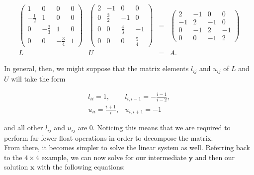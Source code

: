 \documentclass[12pt]{article}
\numberwithin{equation}{section}
\begin{document}
\begin{equation}
\begin{array}{cccc}
\left(\begin{array}{cccc}
1 & 0 & 0 & 0 \\
-\frac{1}{2} & 1 & 0 & 0 \\
0 & -\frac{2}{3} & 1 & 0 \\
0 & 0 & -\frac{3}{4} & 1 
\end{array}\right) &
\left(\begin{array}{cccc}
2 & -1 & 0 & 0 \\
0 & \frac{3}{2} & -1 & 0 \\
0 & 0 & \frac{4}{3} & -1 \\
0 & 0 & 0 & \frac{5}{4} 
\end{array}\right) &=&
\left(\begin{array}{cccc}
2 & -1 & 0 & 0 \\
-1 & 2 & -1 & 0 \\
0 & -1 & 2 & -1 \\
0 & 0 & -1 & 2
\end{array}\right) \\
L & U & = & A.
\end{array}
\end{equation}

\noindent In general, then, we might suppose that the matrix elements $l_{ij}$ and $u_{ij}$ of $L$ and $U$ will take the form

\begin{equation}
\begin{array}{cc}
l_{ii} = 1, & l_{i,i-1} = -\frac{i-1}{i-2}, \\
u_{ii} = \frac{i+1}{i}, & u_{i,i+1}=-1
\end{array}
\end{equation}

\noindent and all other $l_{ij}$ and $u_{ij}$ are 0.  Noticing this means that we are required to perform far fewer float operations in order to decompose the matrix.  
\\\indent From there, it becomes simpler to solve the linear system as well.  Referring back to the $4\times4$ example, we can now solve for our intermediate $\textbf{y}$ and then our solution $\textbf{x}$ with the following equations:
\end{document}
